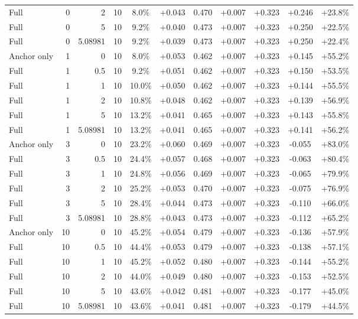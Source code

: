 \begin{table}[htbp]
\begin{tabular}{lrrrccccccc}
Full & 0 & 2 & 10 & 8.0\% & +0.043 & 0.470 & +0.007 & +0.323 & +0.246 & +23.8\% \\
Full & 0 & 5 & 10 & 9.2\% & +0.040 & 0.473 & +0.007 & +0.323 & +0.250 & +22.5\% \\
Full & 0 & 5.08981 & 10 & 9.2\% & +0.039 & 0.473 & +0.007 & +0.323 & +0.250 & +22.4\% \\
Anchor only & 1 & 0 & 10 & 8.0\% & +0.053 & 0.462 & +0.007 & +0.323 & +0.145 & +55.2\% \\
Full & 1 & 0.5 & 10 & 9.2\% & +0.051 & 0.462 & +0.007 & +0.323 & +0.150 & +53.5\% \\
Full & 1 & 1 & 10 & 10.0\% & +0.050 & 0.462 & +0.007 & +0.323 & +0.144 & +55.5\% \\
Full & 1 & 2 & 10 & 10.8\% & +0.048 & 0.462 & +0.007 & +0.323 & +0.139 & +56.9\% \\
Full & 1 & 5 & 10 & 13.2\% & +0.041 & 0.465 & +0.007 & +0.323 & +0.143 & +55.8\% \\
Full & 1 & 5.08981 & 10 & 13.2\% & +0.041 & 0.465 & +0.007 & +0.323 & +0.141 & +56.2\% \\
Anchor only & 3 & 0 & 10 & 23.2\% & +0.060 & 0.469 & +0.007 & +0.323 & -0.055 & +83.0\% \\
Full & 3 & 0.5 & 10 & 24.4\% & +0.057 & 0.468 & +0.007 & +0.323 & -0.063 & +80.4\% \\
Full & 3 & 1 & 10 & 24.8\% & +0.056 & 0.469 & +0.007 & +0.323 & -0.065 & +79.9\% \\
Full & 3 & 2 & 10 & 25.2\% & +0.053 & 0.470 & +0.007 & +0.323 & -0.075 & +76.9\% \\
Full & 3 & 5 & 10 & 28.4\% & +0.044 & 0.473 & +0.007 & +0.323 & -0.110 & +66.0\% \\
Full & 3 & 5.08981 & 10 & 28.8\% & +0.043 & 0.473 & +0.007 & +0.323 & -0.112 & +65.2\% \\
Anchor only & 10 & 0 & 10 & 45.2\% & +0.054 & 0.479 & +0.007 & +0.323 & -0.136 & +57.9\% \\
Full & 10 & 0.5 & 10 & 44.4\% & +0.053 & 0.479 & +0.007 & +0.323 & -0.138 & +57.1\% \\
Full & 10 & 1 & 10 & 45.2\% & +0.052 & 0.480 & +0.007 & +0.323 & -0.144 & +55.2\% \\
Full & 10 & 2 & 10 & 44.0\% & +0.049 & 0.480 & +0.007 & +0.323 & -0.153 & +52.5\% \\
Full & 10 & 5 & 10 & 43.6\% & +0.042 & 0.481 & +0.007 & +0.323 & -0.177 & +45.0\% \\
Full & 10 & 5.08981 & 10 & 43.6\% & +0.041 & 0.481 & +0.007 & +0.323 & -0.179 & +44.5\% \\

\end{tabular}
\end{table}
